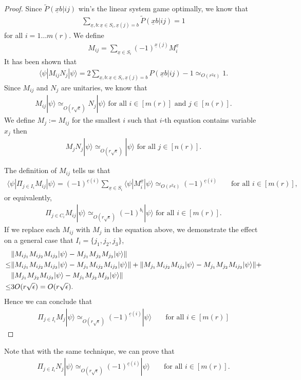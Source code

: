 \documentclass[11pt,letterpaper]{article}
\newcommand{\ket}[1]{|#1\rangle}
\newcommand{\bra}[1]{\langle#1|}
\DeclarePairedDelimiter{\norm}{\lVert}{\rVert}
\newcommand{\1}{\mathbb{1}}
\newcommand{\nr}{n(r)}
\newcommand{\mr}{m(r)}
\newcommand{\ux}{\underline{x}}
\newcommand{\uc}{\underline{c}}
\newcommand{\pr}[2]{P(#1|#2)}
\newcommand{\tpr}[2]{\tilde{P}(#1|#2)}
\newcommand{\ep}{\epsilon}
\newcommand{\se}{\sqrt{\epsilon}}
\newcommand{\appd}[1]{\simeq_{#1}}
\theoremstyle{definition}
\begin{document}
\begin{proof}
Since $\tpr{\ux b}{ij}$ win's the linear system game optimally, we know that 
\begin{align}
\sum_{\ux,b: \ux \in S_i, \ux(j) = b} \tpr{\ux b}{ij} = 1
\end{align}
for all $i = 1 \dots \mr$.
We define 
\begin{align}
	M_{ij} = \sum_{\ux \in S_i} (-1)^{\ux(j)} M_i^{\ux}
\end{align}	
It has been shown \cite{slofstra2017} that 
\begin{align}
	\bra{\psi} M_{ij} N_j \ket{\psi} = 2 \sum_{\ux,b: \ux \in S_i, \ux(j) = b} \pr{\ux b}{ij} -1 \appd{O(r^2 \ep)} 1.
\end{align}
Since $M_{ij}$ and $N_j$ are unitaries, we know that
\begin{align}
	M_{ij} \ket{\psi} \appd{O(r\se)} N_j \ket{\psi} \text{ for all } i \in [\mr] \text{ and } j \in [\nr].
\end{align}
We define $M_j := M_{ij}$ for the smallest $i$ such that $i$-th equation contains variable $x_j$ then 
\begin{align}
	M_j N_j \ket{\psi} \appd{O(r\se)} \ket{\psi} \text{ for all } j \in [\nr].
\end{align}

The definition of $M_{ij}$ tells us that 
\begin{align}
	\bra{\psi} \Pi_{j \in I_i} M_{ij} \ket{\psi} = (-1)^{\uc(i)}  \sum_{\ux \in S_i } \bra{\psi} M_i^{\ux} \ket{\psi} 
	\appd{O(r^2 \ep)} (-1)^{\uc(i)} &&
	\text{ for all } i \in [\mr],
\end{align}
or equivalently,
\begin{align}
	\Pi_{j \in C_i} M_{ij} \ket{\psi} \appd{O(r\se)} (-1)^{b_i} \ket{\psi}\text{ for all } i \in [\mr].
\end{align}	
If we replace each $M_{ij}$ with $M_j$ in the equation above, we demonstrate the effect on a
general case that $I_i = \{j_1, j_2, j_3\}$,
\begin{align}
	&\norm{ M_{ij_1}M_{ij_2}M_{ij_3} \ket{\psi} - M_{j_1}M_{j_2}M_{j_3} \ket{\psi}}\\
	\leq & \norm{M_{ij_1}M_{ij_2}M_{ij_3} \ket{\psi} - M_{j_1}M_{ij_2}M_{ij_3} \ket{\psi}}+
	\norm{M_{j_1}M_{ij_2}M_{ij_3} \ket{\psi} - M_{j_1}M_{j_2}M_{ij_3} \ket{\psi}} +\\
	&\norm{M_{j_1}M_{j_2}M_{ij_3} \ket{\psi} - M_{j_1}M_{j_2}M_{j_3} \ket{\psi}}\\
	\leq &3O(r\se) = O(r\se).
\end{align}
Hence we can conclude that 
\begin{align}
	\Pi_{j \in I_i} M_j \ket{\psi} \appd{O(r\se)} (-1)^{\uc(i)}\ket{\psi} &&\text{ for all } i \in [\mr]
\end{align}
\end{proof}
Note that with the same technique, we can prove that 
\begin{align}
	\Pi_{j \in I_i} N_j \ket{\psi} \appd{O(r\se)} (-1)^{\uc(i)}\ket{\psi} && \text{ for all } i \in [\mr].
\end{align}
\end{document}

